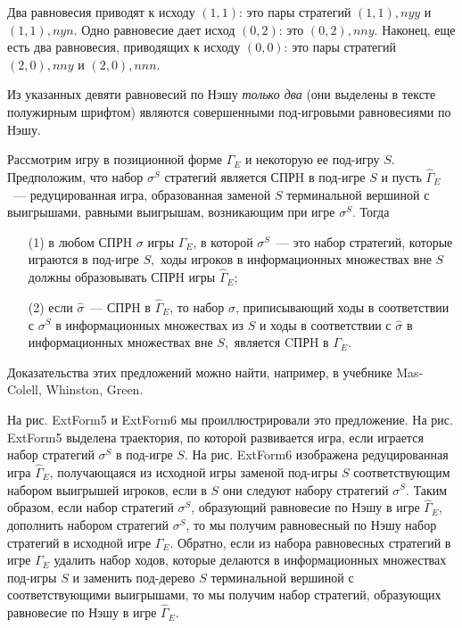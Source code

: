 \documentclass[12pt]{book}
\begin{document}
Два равновесия приводят к исходу $(1,1)$: это пары стратегий
\textbf{$(1,1), nyy$} и $(1,1), nyn$.
Одно равновесие дает исход $(0,2)$: это $(0,2), nny$. Наконец, еще
есть два равновесия, приводящих к исходу $(0,0)$: это пары стратегий
$(2,0), nny$ и $(2,0), nnn$.

Из указанных девяти равновесий по Нэшу \emph{только два} (они выделены в тексте
полужирным шрифтом) являются совершенными под-игровыми равновесиями по Нэшу.



\begin{proposition}
Рассмотрим игру в позиционной форме $\Gamma_E$ и некоторую ее
под-игру $S$.  Предположим, что набор $\sigma^S$ стратегий является
СПРH в под-игре $S$ и пусть $\widehat\Gamma_E$~--- редуцированная
игра, образованная заменой $S$ терминальной вершиной с выигрышами,
равными выигрышам, возникающим при игре $\sigma^S.$ Тогда
\begin{itemize}
\item[(1)] в любом СПРH $\sigma$ игры $\Gamma_E$, в которой
$\sigma^S$~--- это набор стратегий, которые играются в под-игре $S,$
ходы игроков в информационных множествах вне $S$ должны образовывать
СПРH  игры $\widehat\Gamma_E$;
\item[(2)]  если $\hat\sigma$~--- СПРH в $\widehat\Gamma_E$, то
набор $\sigma$, приписывающий ходы в соответствии с $\sigma^S$ в
информационных множествах из $S$ и ходы в соответствии с $\hat
\sigma$  в информационных множествах вне $S,$ является CПРH в
$\Gamma_E$.
\end{itemize}
\end{proposition}

Доказательства этих предложений можно  найти, например, в учебнике
Mas-Colell, Whinston, Green.

На рис. ExtForm5 и ExtForm6 мы проиллюстрировали это предложение.
На рис. ExtForm5 выделена траектория, по которой развивается игра, если
играется набор стратегий $\sigma^S$ в под-игре $S$. На рис. ExtForm6 изображена
редуцированная игра $\widehat\Gamma_E$, получающаяся из исходной игры заменой
под-игры $S$ соответствующим набором выигрышей игроков, если в $S$ они следуют
набору стратегий $\sigma^S$. Таким образом, если набор стратегий $\sigma^S$,
образующий равновесие по Нэшу в игре $\widehat\Gamma_E$, дополнить набором
стратегий $\sigma^S$, то мы получим равновесный по Нэшу набор стратегий в
исходной игре $\Gamma_E$. Обратно, если из набора равновесных стратегий в игре
$\Gamma_E$ удалить набор ходов, которые делаются в информационных множествах
под-игры $S$ и заменить под-дерево $S$ терминальной вершиной с соответствующими
выигрышами, то мы получим набор стратегий, образующих равновесие по Нэшу в игре
$\widehat\Gamma_E$.
\end{document}
